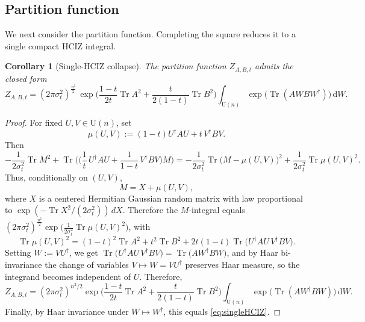 \documentclass[11pt,a4paper]{article}
\newtheorem{corollary}[theorem]{Corollary}
\theoremstyle{definition}\newtheorem{definition}[theorem]{Definition}
\theoremstyle{remark}\newtheorem{remark}[theorem]{Remark}
\numberwithin{equation}{section}
\DeclareMathOperator{\Tr}{Tr}
\newcommand{\dd}{\mathrm{d}}
\newcommand{\UU}{\mathrm{U}(n)}
\begin{document}
\subsection{Partition function}

We next consider the partition function. Completing the square reduces it to a single compact HCIZ integral.

\begin{corollary}[Single-HCIZ collapse]
\label{cor:collapse}
The partition function $Z_{A,B,t}$ admits the closed form
\begin{equation}\label{eq:singleHCIZ}
Z_{A,B,t}
=(2\pi\sigma_t^2)^{\frac{n^2}{2}}\,
\exp\!\Big(\frac{1-t}{2t}\Tr A^2+\frac{t}{2(1-t)}\Tr B^2\Big)
\int_{\UU}\exp\!\big(\Tr(AWBW^\dagger)\big)\,\dd W .
\end{equation}
\end{corollary}

\begin{proof}
For fixed $U,V\in\UU$, set
\begin{equation}
\mu(U,V):=(1-t)U^\dagger A U+t\,V^\dagger B V.
\end{equation}
Then
\begin{equation}
-\frac{1}{2\sigma_t^2}\Tr M^2
+\Tr\!\Big(\Big(\frac1t\,U^\dagger A U+\frac1{1-t}\,V^\dagger B V\Big)M\Big)
=
-\frac{1}{2\sigma_t^2}\Tr\!\big(M-\mu(U,V)\big)^2
+\frac{1}{2\sigma_t^2}\Tr\mu(U,V)^2.
\end{equation}
Thus, conditionally on $(U,V)$,
\begin{equation}
    M=X+\mu(U,V),
\end{equation}
where $X$ is a centered Hermitian Gaussian random matrix with law proportional to $\exp(-\Tr X^2/(2\sigma_t^2))\,dX$.
Therefore the $M$-integral equals
$(2\pi\sigma_t^2)^{\frac{n^2}{2}}
\exp\!\Big(\frac{1}{2\sigma_t^2}\Tr\mu(U,V)^2\Big)$,
with
\begin{equation}
\Tr\mu(U,V)^2
=
(1-t)^2\Tr A^2+t^2\Tr B^2
+2t(1-t)\Tr\!\big(U^\dagger A U\,V^\dagger B V\big).
\end{equation}
Setting $W:=VU^\dagger$, we get
$\Tr\!\big(U^\dagger A U\,V^\dagger B V\big)=\Tr\!\big(AW^\dagger B W\big)$, 
and by Haar bi-invariance the change of variables $V\mapsto W=VU^\dagger$ preserves Haar measure, so the integrand becomes independent of $U$.   Therefore,
\begin{equation}
Z_{A,B,t}
=
(2\pi\sigma_t^2)^{n^2/2}
\exp\!\Big(\frac{1-t}{2t}\Tr A^2+\frac{t}{2(1-t)}\Tr B^2\Big)
\int_{\UU}\exp\!\big(\Tr(AW^\dagger BW)\big)\,\dd W.
\end{equation}
Finally, by Haar invariance under \(W\mapsto W^\dagger\), this equals
\eqref{eq:singleHCIZ}.
\end{proof}
\end{document}
